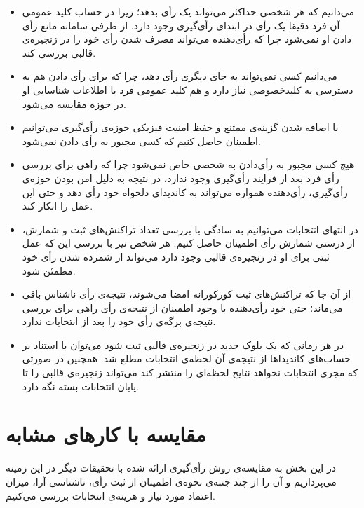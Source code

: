 \begin{itemize}
	\item 
	می‌دانیم که هر شخصی حداکثر می‌تواند یک رأی‌ بدهد؛ زیرا در حساب کلید عمومی آن فرد دقیقا یک رأی در ابتدای رأی‌گیری وجود دارد. از طرفی سامانه مانع رأی دادن او نمی‌شود چرا که رأی‌دهنده می‌تواند مصرف شدن رأی خود را در زنجیره‌ی قالبی بررسی کند.
	\item 
	می‌دانیم کسی نمی‌تواند به جای دیگری رأی دهد، چرا که برای رأی دادن هم به دسترسی به کلیدخصوصی نیاز دارد و هم کلید عمومی فرد با اطلاعات شناسایی او در حوزه مقایسه می‌شود.
	\item 
	با اضافه شدن گزینه‌ی ممتنع و حفظ امنیت فیزیکی حوزه‌ی رأی‌گیری می‌توانیم اطمینان حاصل کنیم که کسی مجبور به رأی‌ دادن نمی‌شود.
	\item 
 هیچ کسی مجبور به رأی‌دادن به شخصی خاص نمی‌شود چرا که راهی برای بررسی رأی‌ فرد بعد از فرایند رأی‌گیری وجود ندارد، در نتیجه به دلیل امن بودن حوزه‌ی رأی‌گیری، رأی‌دهنده همواره می‌تواند به کاندیدای دلخواه خود رأی‌ دهد و حتی این عمل را انکار کند.
	\item 
	در انتهای انتخابات می‌توانیم به سادگی با بررسی تعداد تراکنش‌های ثبت و شمارش، از درستی شمارش رأی اطمینان حاصل کنیم. هر شخص نیز با بررسی این که عمل ثبتی برای او در زنجیره‌ی قالبی وجود دارد می‌تواند از شمرده شدن رأی خود مطمئن شود.
	\item 
	از آن جا که تراکنش‌های ثبت کورکورانه امضا می‌شوند، نتیجه‌ی رأی ناشناس باقی می‌ماند؛ حتی خود رأی‌دهنده با وجود اطمینان از نتیجه‌ی رأی راهی برای بررسی نتیجه‌ی برگه‌ی رأی خود را بعد از انتخابات ندارد.
	\item 
	در هر زمانی که یک بلوک جدید در زنجیره‌ی قالبی ثبت شود می‌توان با استناد بر حساب‌های کاندیداها از نتیجه‌ی آن لحظه‌ی انتخابات مطلع شد. همچنین در صورتی که مجری انتخابات نخواهد نتایج لحظه‌ای را منتشر کند می‌تواند زنجیره‌ی قالبی را تا پایان انتخابات بسته نگه دارد. 
\end{itemize}




\section{مقایسه با کارهای مشابه}
در این بخش به مقایسه‌‌ی روش رأی‌گیری ارائه شده با تحقیقات دیگر در این زمینه می‌پردازیم و آن را از چند جنبه‌ی نحوه‌ی اطمینان از ثبت رأی، ناشناسی آرا،  میزان اعتماد مورد نیاز و  هزینه‌ی انتخابات بررسی می‌کنیم. 
